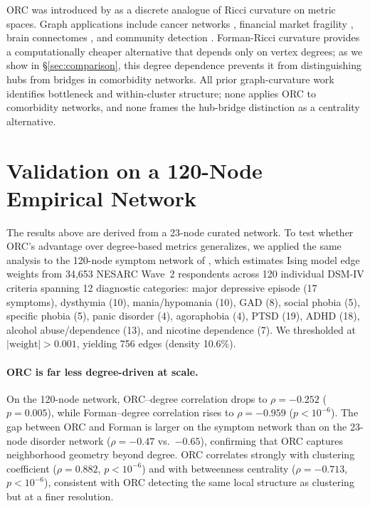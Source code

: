 \documentclass{article}
\begin{document}
ORC was introduced by \citet{ollivier2009ricci} as a discrete analogue of Ricci curvature on metric spaces. Graph applications include cancer networks \citep{sandhu2015graph}, financial market fragility \citep{sandhu2016ricci}, brain connectomes \citep{ni2015ricci}, and community detection \citep{sia2019ollivier}. Forman-Ricci curvature \citep{forman2003bochner} provides a computationally cheaper alternative that depends only on vertex degrees; as we show in \S\ref{sec:comparison}, this degree dependence prevents it from distinguishing hubs from bridges in comorbidity networks. All prior graph-curvature work identifies bottleneck and within-cluster structure; none applies ORC to comorbidity networks, and none frames the hub-bridge distinction as a centrality alternative.

\section{Validation on a 120-Node Empirical Network}
\label{sec:validation}

The results above are derived from a 23-node curated network. To test whether ORC's advantage over degree-based metrics generalizes, we applied the same analysis to the 120-node symptom network of \citet{boschloo2015network}, which estimates Ising model edge weights from 34{,}653 NESARC Wave~2 respondents across 120 individual DSM-IV criteria spanning 12 diagnostic categories: major depressive episode (17 symptoms), dysthymia (10), mania/hypomania (10), GAD (8), social phobia (5), specific phobia (5), panic disorder (4), agoraphobia (4), PTSD (19), ADHD (18), alcohol abuse/dependence (13), and nicotine dependence (7). We thresholded at $|\text{weight}| > 0.001$, yielding 756 edges (density 10.6\%).

\paragraph{ORC is far less degree-driven at scale.} On the 120-node network, ORC--degree correlation drops to $\rho = -0.252$ ($p = 0.005$), while Forman--degree correlation rises to $\rho = -0.959$ ($p < 10^{-6}$). The gap between ORC and Forman is larger on the symptom network than on the 23-node disorder network ($\rho = -0.47$ vs.\ $-0.65$), confirming that ORC captures neighborhood geometry beyond degree. ORC correlates strongly with clustering coefficient ($\rho = 0.882$, $p < 10^{-6}$) and with betweenness centrality ($\rho = -0.713$, $p < 10^{-6}$), consistent with ORC detecting the same local structure as clustering but at a finer resolution.
\end{document}
